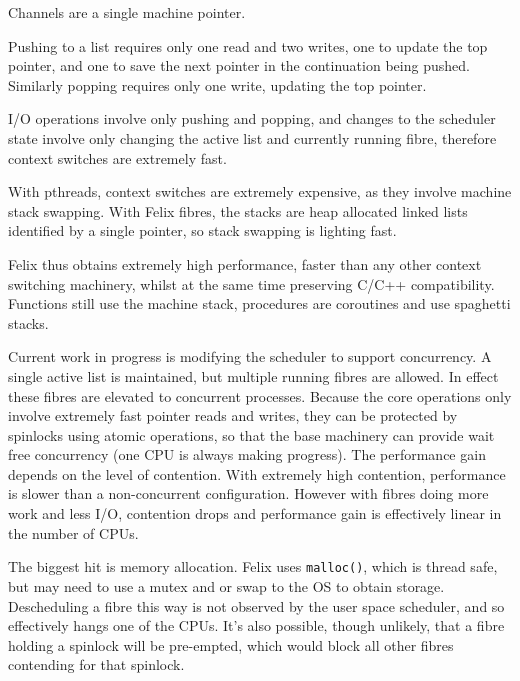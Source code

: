 \documentclass[oneside]{book}
\begin{document}
Channels are a single machine pointer.

Pushing to a list requires only one read and two writes,
one to update the top pointer, and one to save the next pointer 
in the continuation being pushed. Similarly popping requires
only one write, updating the top pointer.

I/O operations involve only pushing and popping, and changes to the
scheduler state involve only changing the active list and currently
running fibre, therefore context switches are extremely fast.

With pthreads, context switches are extremely expensive, as they
involve machine stack swapping. With Felix fibres, the stacks are
heap allocated linked lists identified by a single pointer,
so stack swapping is lighting fast. 

Felix thus obtains extremely high performance, faster than any
other context switching machinery, whilst at the same time
preserving C/C++ compatibility. Functions still use the machine stack,
procedures are coroutines and use spaghetti stacks.

Current work in progress is modifying the scheduler to support
concurrency. A single active list is maintained, but multiple
running fibres are allowed. In effect these fibres are elevated
to concurrent processes. Because the core operations only involve
extremely fast pointer reads and writes, they can be protected by
spinlocks using atomic operations, so that the base machinery
can provide wait free concurrency (one CPU is always making progress).
The performance gain depends on the level of contention. With extremely
high contention, performance is slower than a non-concurrent configuration.
However with fibres doing more work and less I/O, contention drops and
performance gain is effectively linear in the number of CPUs.

The biggest hit is memory allocation. Felix uses \verb$malloc()$, which
is thread safe, but may need to use a mutex and or swap to the OS to
obtain storage. Descheduling a fibre this way is not observed by the
user space scheduler, and so effectively hangs one of the CPUs.
It's also possible, though unlikely, that a fibre holding a spinlock
will be pre-empted, which would block all other fibres contending
for that spinlock.


\clearpage
{}
{}
\listoflistings
%
\clearpage
{}
\printindex[codeindex] 
%
\clearpage
{}
\printindex
%
\end{document}
